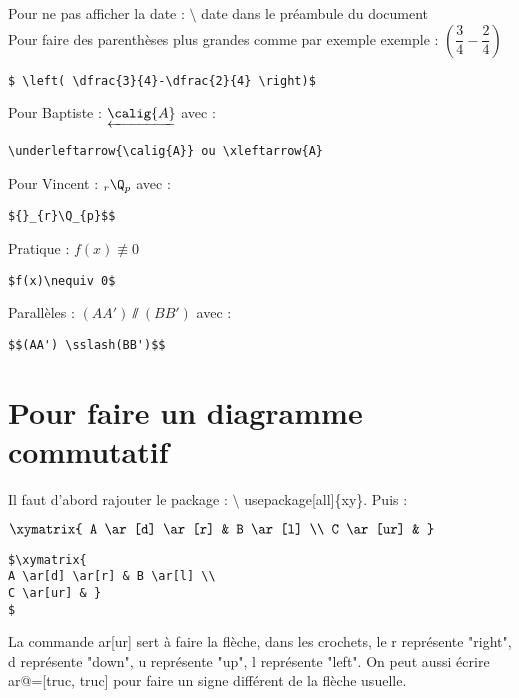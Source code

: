 \documentclass[12pt,french,oneside]{report}
\begin{document}
\begin{spacing}{1.2}
Pour ne pas afficher la date : $\setminus$ date{} dans le préambule du document\\

Pour faire des parenthèses plus grandes comme par exemple exemple : $ \left( \dfrac{3}{4}-\dfrac{2}{4} \right)$

\begin{verbatim}
$ \left( \dfrac{3}{4}-\dfrac{2}{4} \right)$
\end{verbatim}

Pour Baptiste : $\underleftarrow{\calig{A}}$ avec :

\begin{verbatim}
\underleftarrow{\calig{A}} ou \xleftarrow{A} 
\end{verbatim}

Pour Vincent : ${}_{r}\Q_{p}$ avec :

\begin{verbatim}
${}_{r}\Q_{p}$$
\end{verbatim}

Pratique : $f(x)\nequiv 0$
\begin{verbatim}
$f(x)\nequiv 0$
\end{verbatim}

Parallèles : $(AA') \sslash(BB')$ avec : 
\begin{verbatim}
$$(AA') \sslash(BB')$$
\end{verbatim}



\section{Pour faire un diagramme commutatif}

Il faut d'abord rajouter le package : $\setminus$ usepackage[all]\{xy\}. Puis :\\


\begin{center}
$\xymatrix{
A \ar[d] \ar[r] & B \ar[l] \\
C \ar[ur] & }
$
\end{center}

\begin{verbatim}
$\xymatrix{
A \ar[d] \ar[r] & B \ar[l] \\
C \ar[ur] & }
$
\end{verbatim}

La commande ar[ur] sert à faire la flèche, dans les crochets, le r représente "right", d représente "down", u représente "up", l représente "left". On peut aussi écrire ar@{=}[truc, truc] pour faire un signe différent de la flèche usuelle.


\end{spacing}
\end{document}
